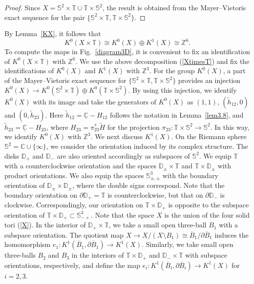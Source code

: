 \documentclass{amsart}
\theoremstyle{plain}
\theoremstyle{definition}
\theoremstyle{remark}
\newcommand{\Z}{\mathbb{Z}}
\newcommand{\C}{\mathbb{C}}
\newcommand{\T}{\mathbb{T}}
\newcommand{\D}{\mathbb{D}}
\newcommand{\SSS}{\mathbb{S}}
\newcommand{\tH}{\widetilde{H}}
\newcommand{\thh}{\tilde{h}}
\newcommand{\uC}{\underline{\C}}
\begin{document}
\begin{proof}
Since $X = \SSS^2 \times \T \cup \T \times \SSS^2$, the result is obtained from the Mayer--Vietoris exact sequence for the pair $\{ \SSS^2 \times \T, \T \times \SSS^2\}$.
\end{proof}

By Lemma~\ref{KX}, it follows that
\begin{equation}
\label{XtimesT}
	K^0(X \times \T) \cong K^0(X) \oplus K^1(X) \cong \Z^6.
\end{equation}
To compute the maps in Fig.~\ref{diagram3D}, it is convenient to fix an identification of $K^0(X \times \T)$ with $\Z^6$.
We use the above decomposition (\ref{XtimesT}) and fix the identifications of $K^0(X)$ and $K^1(X)$ with $\Z^3$.
For the group $K^0(X)$, a part of the Mayer--Vietoris exact sequence for $\{ \SSS^2 \times \T, \T \times \SSS^2 \}$ provides an injection $K^0(X) \to K^0(\SSS^2 \times \T) \oplus K^0(\T \times \SSS^2)$.
By using this injection, we identify $K^0(X)$ with its image and take the generators of $K^0(X)$ as $(1,1)$, $(\thh_{12}, 0)$ and $(0, \thh_{23})$.
Here $\thh_{12} = \uC - H_{12}$ follows the notation in Lemma~\ref{lem3.8}, and $\thh_{23} = \uC - H_{23}$, where $H_{23} = \pi_{23}^* \tH$ for the projection $\pi_{23} \colon \T \times \SSS^2 \to \SSS^2$.
In this way, we identify $K^0(X)$ with $\Z^3$.
We next discuss $K^1(X)$.
On the Riemann sphere $\SSS^2 = \C \cup \{ \infty \}$, we consider the orientation induced by its complex structure.
The disks $\D_+$ and $\D_-$ are also oriented accordingly as subspaces of $\SSS^2$.
We equip $\T$ with a counterclockwise orientation and the spaces $\D_\pm \times \T$ and $\T \times \D_\pm$ with product orientations.
We also equip the spaces $\SSS^3_{\pm, \pm}$ with the boundary orientation of $\D_\pm \times \D_\pm$, where the double signs correspond.
Note that the boundary orientation on $\partial \D_+ = \T$ is counterclockwise, but that on $\partial \D_-$ is clockwise.
Correspondingly, our orientation on $\T \times \D_+$ is opposite to the subspace orientation of $\T \times \D_+ \subset \SSS^3_{-+}$.
Note that the space $X$ is the union of the four solid tori (\ref{X}).
In the interior of $\D_+ \times \T$, we take a small open three-ball $B_1$ with a subspace orientation.
The quotient map $X \to X/ (X \setminus B_1) \cong \overline{B}_1 / \partial \overline{B}_1$ induces the homomorphism $e_1 \colon K^1(\overline{B}_1, \partial \overline{B}_1) \to K^1(X)$.
Similarly, we take small open three-balls $B_2$ and $B_3$ in the interiors of $\T \times \D_+$ and $\D_- \times \T$ with subspace orientations, respectively, and define the map $e_i \colon K^1(\overline{B}_i, \partial \overline{B}_i) \to K^1(X)$ for $i=2,3$.
\end{document}
